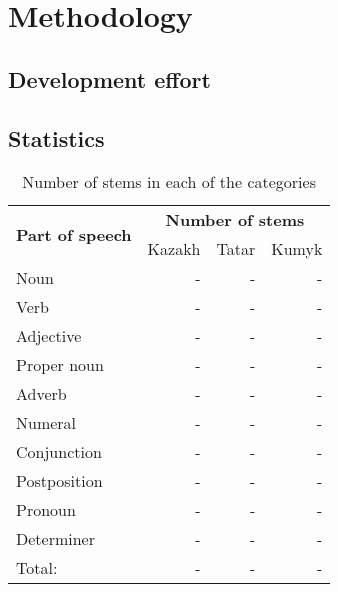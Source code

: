 \documentclass[a4paper,11pt,twocolumn]{article}
\begin{document}
\cite{bammatov1960}
\cite{olmesov2000}

\section{Methodology}



\subsection{Development effort}

\subsection{Statistics}

\begin{table}
\begin{center}
\begin{tabular}{|l|rrr|}
		\hline
\multirow{2}{*}{\textbf{Part of speech}} & \multicolumn{3}{|c|}{\textbf{Number of stems}} \\ \cline{2-4}
                        & Kazakh & Tatar & Kumyk \\
		\hline
		Noun & - & - & - \\
		Verb & - & - & - \\
		Adjective & - & - & - \\
		Proper noun & - & - & - \\
		Adverb & - & - & - \\
		Numeral & - & - & - \\
		Conjunction & - & - & - \\
		Postposition & - & - & - \\
		Pronoun & - & - & - \\
		Determiner & - & - & - \\
		\hline
		Total: & - & - & - \\
		\hline
\end{tabular}
 \caption{Number of stems in each of the categories}
 \label{table:coverage}
\end{center}

\end{table}
\end{document}
